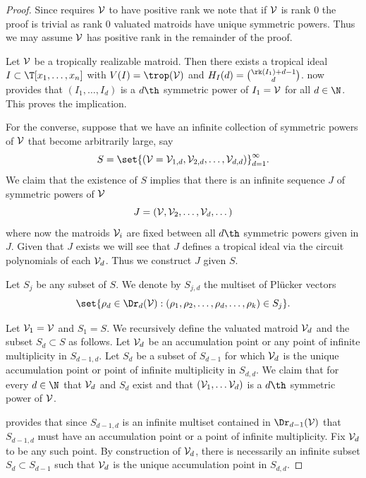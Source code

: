 \begin{proof}
Since  requires $\mathcal{V}$ to have positive rank we note that if $\mathcal{V}$ is rank $0$ the proof is trivial as rank $0$ valuated matroids have unique symmetric powers. Thus we may assume $\mathcal{V}$ has positive rank in the remainder of the proof.

Let $\mathcal{V}$ be a tropically realizable matroid. Then there exists a tropical ideal $I\subset \T[x_1,\dots, x_n]$ with $V(I)=\trop(\sV)$ and $H_I(d)=\binom{\rk(I_1)+d-1}{d}$.  now provides that $(I_1,\dots,I_d)$ is a $d\th$ symmetric power of $I_1=\mathcal{V}$ for all $d\in \N$. This proves the implication.

For the converse, suppose that we have an infinite collection of symmetric powers of $\mathcal{V}$ that become arbitrarily large, say 
$$S = \set{(\sV=\sV_{1,d},\sV_{2,d},\dots, \sV_{d,d})}_{d=1}^\infty.$$
We claim that the existence of $S$ implies that there is an infinite sequence $J$ of symmetric powers of $\mathcal{V}$
$$J = (\mathcal{V}, \mathcal{V}_2, \dots, \mathcal{V}_d, \dots)$$
where now the matroids $\mathcal{V}_i$ are fixed between all $d\th$ symmetric powers given in $J$. Given that $J$ exists we will see that $J$ defines a tropical ideal via the circuit polynomials of each $\mathcal{V}_d$. Thus we construct $J$ given $S$.

Let $S_j$ be any subset of $S$. We denote by $S_{j,d}$ the multiset of Pl\"ucker vectors
$$\set{\rho_d\in \Dr_d(\sV): (\rho_1,\rho_2,\dots, \rho_d,\dots, \rho_k)\in S_j}.$$

Let $\mathcal{V}_1 = \mathcal{V}$ and $S_1=S$. We recursively define the valuated matroid $\mathcal{V}_d$ and the subset $S_d\subset S$ as follows. Let $\mathcal{V}_d$ be an accumulation point or any point of infinite multiplicity in $S_{d-1,d}$. Let $S_d$ be a subset of $S_{d-1}$ for which $\mathcal{V}_d$ is the unique accumulation point or point of infinite multiplicity in $S_{d,d}$. We claim that for every $d\in \N$ that $\mathcal{V}_d$ and $S_d$ exist and that $(\mathcal{V}_1,\dots \mathcal{V}_d)$ is a $d\th$ symmetric power of $\mathcal{V}$.

 provides that since $S_{d-1,d}$ is an infinite multiset contained in $\Dr_{d-1}(\sV)$ that $S_{d-1,d}$ must have an accumulation point or a point of infinite multiplicity. Fix $\mathcal{V}_d$ to be any such point. By construction of $\mathcal{V}_d$, there is necessarily an infinite subset $S_d\subset S_{d-1}$ such that $\mathcal{V}_d$ is the unique accumulation point in $S_{d,d}$. 


\end{proof}
